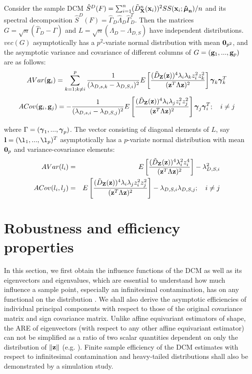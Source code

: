 \documentclass[fleqn,11pt]{article}
\begin{document}
\begin{Corollary} \label{Corollary:eigendist}
Consider the sample DCM $ \hat S^D(F) = \sum_{i=1}^n (\tilde D^n_{\mathbf{X}} ({\bf{x}}_i))^2 SS({\bf{x}}_i; {\bf \hat{{\boldsymbol{\mu}}}_n})/n $ and its spectral decomposition $\hat S^D(F) = \hat\Gamma_D \hat\Lambda_D \hat\Gamma_D^T $. Then the matrices $G = \sqrt n (\hat\Gamma_D - \Gamma) $ and $L = \sqrt n (\hat\Lambda_D - \Lambda_{D,S}) $ have independent distributions. $vec(G)$ asymptotically has a $p^2$-variate normal distribution with mean ${\bf 0}_{p^2}$, and the asymptotic variance and covariance of different columns of $G = ({\bf{g}}_1,...,{\bf{g}}_p)$ are as follows:
\begin{equation} \label{equation:DevEq}
AVar({\bf{g}}_i) = \sum_{k=1; k \neq i}^p \frac{1}{(\lambda_{D,s,k} - \lambda_{D,S,i})^2} E \left[ \frac{(\tilde D_{\mathbf{Z}} ({\bf{z}}))^4 \lambda_i \lambda_k z_i^2 z_k^2}{({\bf{z}}^T \Lambda {\bf{z}})^2} \right] {\boldsymbol{\gamma}}_k {\boldsymbol{\gamma}}_k^T
\end{equation}
\begin{equation}
ACov({\bf{g}}_i, {\bf{g}}_j) = - \frac{1}{(\lambda_{D,s,i} - \lambda_{D,S,j})^2} E \left[ \frac{(\tilde D_{\mathbf{Z}} ({\bf{z}}))^4 \lambda_i \lambda_j z_i^2 z_j^2}{({\bf{z}}^T \Lambda {\bf{z}})^2} \right] {\boldsymbol{\gamma}}_j {\boldsymbol{\gamma}}_i^T; \quad i \neq j
\end{equation}

where $\Gamma = ({\boldsymbol{\gamma}}_1,...,{\boldsymbol{\gamma}}_p)$. The vector consisting of diagonal elements of $L$, say $\bfl = (\l_1,...,\l_p)^T$ asymptotically has a $p$-variate normal distribution with mean ${\bf 0}_p$ and variance-covariance elements:
\begin{eqnarray}
AVar(l_i) &=& E \left[ \frac{(\tilde D_{\mathbf{Z}} ({\bf{z}}))^4 \lambda_i^2 z_i^4}{({\bf{z}}^T \Lambda {\bf{z}})^2} \right] - \lambda_{D,S,i}^2\\
ACov(l_i, l_j) &=& E \left[ \frac{(\tilde D_{\mathbf{Z}} ({\bf{z}}))^4 \lambda_i \lambda_j z_i^2 z_j^2}{({\bf{z}}^T \Lambda {\bf{z}})^2} \right] - \lambda_{D,S,i} \lambda_{D,S,j}; \quad i \neq j
\end{eqnarray}

\end{Corollary}

\section{Robustness and efficiency properties} \label{section:simSection}
In this section, we first obtain the influence functions of the DCM as well as its eigenvectors and eigenvalues, which are essential to understand how much influence a sample point, especially an infinitesimal contamination, has on any functional on the distribution \citep{hampel}. We shall also derive the asymptotic efficiencies of individual principal components with respect to those of the original covariance matrix and sign covariance matrix. Unlike affine equivariant estimators of shape, the ARE of eigenvectors (with respect to any other affine equivariant estimator) can not be simplified as a ratio of two scalar quantities dependent on only the distribution of $\| {\bf{z}} \|$ (e.g. \cite{taskinen12,ollilia03}). Finite sample efficiency of the DCM estimates with respect to infinitesimal contamination and heavy-tailed distributions shall also be demonstrated by a simulation study.
\end{document}
